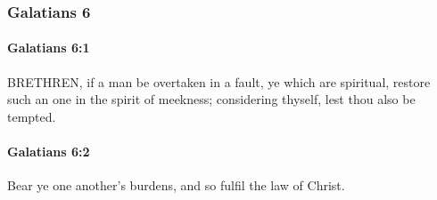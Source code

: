 	\subsubsection{Galatians 6} %
		\label{GALATIANS-6}
		
		\paragraph{Galatians 6:1} %
			\label{GALATIANS-6-1}

			BRETHREN, if a man be overtaken in a fault, ye which are spiritual, restore such an one in the spirit of meekness; considering thyself, lest thou also be tempted.

			\begin{framed}
			\scriptsize
				\begin{compactdesc}
					\item[SBLG] 
				\end{compactdesc}
			\end{framed}

		\paragraph{Galatians 6:2} %
			\label{GALATIANS-6-2}

			Bear ye one another's burdens, and so fulfil the law of Christ.

